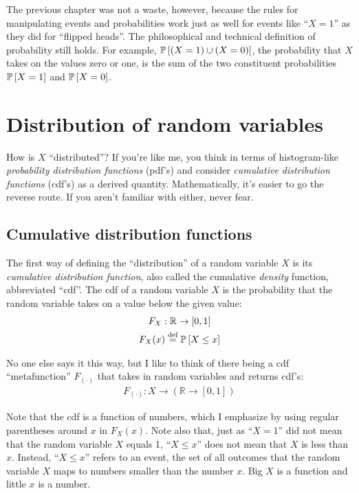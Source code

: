 The previous chapter was not a waste, however, because the
rules for manipulating events and probabilities work just as well for
events like ``$X = 1$'' as they did for ``flipped heads''. The philosophical and
technical definition of probability still holds. For example, $\mathbb{P}\left[{(X = 1)
\cup (X = 0)}\right]$, the probability that $X$ takes on the values zero or one, is the
sum of the two constituent probabilities $\mathbb{P}\left[{X=1}\right]$ and
$\mathbb{P}\left[{X=0}\right]$.

\section{Distribution of random variables}

How is $X$ ``distributed''? If you're like me, you think in terms of
histogram-like \emph{probability distribution functions} (pdf's) and consider
\emph{cumulative distribution functions} (cdf's) as a derived quantity.
Mathematically, it's easier to go the reverse route. If you aren't familiar
with either, never fear.

\subsection{Cumulative distribution functions}

The first way of defining the ``distribution'' of a random variable $X$ is its
\emph{cumulative distribution function}, also called the cumulative
\emph{density} function, abbreviated ``cdf''. The cdf of a random
variable $X$ is the probability that the random variable takes on a value
below the given value:
\begin{gather*}
F_X : \mathbb{R} \to [0, 1] \\
F_X(x) \stackrel{\text{def}}{=} \mathbb{P}\left[{X \leq x}\right]
\end{gather*}

No one else says it this way, but I like to think of there being a cdf
``metafunction'' $F_{(\cdot)}$ that takes in random variables and returns
cdf's:
\begin{gather*}
F_{(\cdot)} : X \to \left( \mathbb{R} \to [0, 1] \right)
\end{gather*}

Note that the cdf is a function of numbers, which I emphasize by using regular
parentheses around $x$ in $F_X(x)$. Note also that, just as ``$X = 1$'' did
not mean that the random variable $X$ equals 1, ``$X \leq x$'' does not mean
that $X$ is less than $x$. Instead, ``$X \leq x$'' refers to an event, the set
of all outcomes that the random variable $X$ maps to numbers smaller than the
number $x$. Big $X$ is a function and little $x$ is a number.

